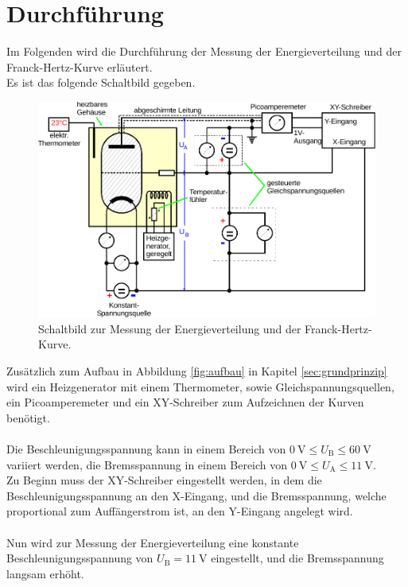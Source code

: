 \section{Durchführung}

    Im Folgenden wird die Durchführung der Messung der Energieverteilung und der Franck-Hertz-Kurve erläutert.\\
    Es ist das folgende Schaltbild gegeben.
    \begin{figure}[H]
        \centering
        \includegraphics[scale=0.8]{content/img/Abb_6.pdf}
        \caption{Schaltbild zur Messung der Energieverteilung und der Franck-Hertz-Kurve.}
        \label{fig:schaltbild}
    \end{figure}
    Zusätzlich zum Aufbau in Abbildung \ref{fig:aufbau} in Kapitel \ref{sec:grundprinzip} wird ein Heizgenerator mit einem Thermometer,
    sowie Gleichspannungsquellen,
    ein Picoamperemeter und ein XY-Schreiber zum Aufzeichnen der Kurven benötigt.\\
    \\
    Die Beschleunigungsspannung kann in einem Bereich von $\SI{0}{\volt} \leq U_\text{B} \leq \SI{60}{\volt}$ variiert werden,
    die Bremsspannung in einem Bereich von $\SI{0}{\volt} \leq U_\text{A} \leq \SI{11}{\volt}$.\\
    Zu Beginn muss der XY-Schreiber eingestellt werden,
    in dem die Beschleunigungsspannung an den X-Eingang,
    und die Bremsspannung,
    welche proportional zum Auffängerstrom ist,
    an den Y-Eingang angelegt wird.\\
    \\
    Nun wird zur Messung der Energieverteilung eine konstante Beschleunigungsspannung von $U_\text{B} = \SI{11}{\volt}$ eingestellt,
    und die Bremsspannung langsam erhöht.

